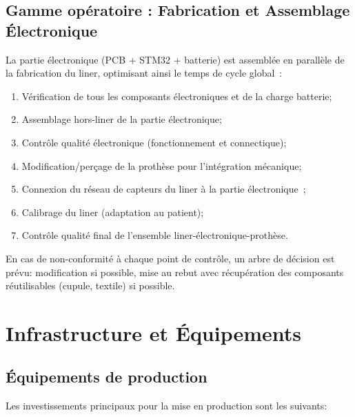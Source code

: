 \subsection{Gamme opératoire : Fabrication et Assemblage Électronique}

La partie électronique (PCB + STM32 + batterie) est assemblée en parallèle de la fabrication
du liner, optimisant ainsi le temps de cycle global~:

\begin{enumerate}
  \item Vérification de tous les composants électroniques et de la charge batterie;
  \item Assemblage hors-liner de la partie électronique;
  \item Contrôle qualité électronique (fonctionnement et connectique);
  \item Modification/perçage de la prothèse pour l'intégration mécanique;
  \item Connexion du réseau de capteurs du liner à la partie électronique~;
  \item Calibrage du liner (adaptation au patient);
  \item Contrôle qualité final de l'ensemble liner-électronique-prothèse.
\end{enumerate}

En cas de non-conformité à chaque point de contrôle, un arbre de décision est prévu: modification si
possible, mise au rebut avec récupération des composants réutilisables (cupule, textile) si possible.

\section{Infrastructure et Équipements}

\subsection{Équipements de production}

Les investissements principaux pour la mise en production sont les suivants:

